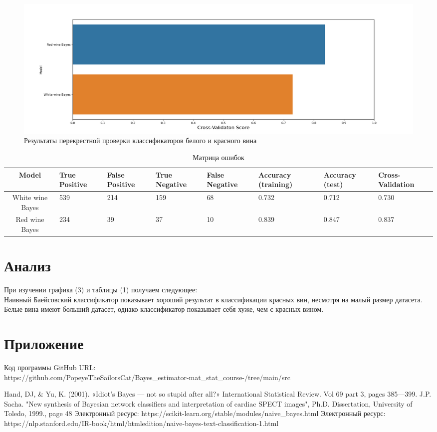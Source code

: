 \documentclass{article}
\begin{document}
\begin{figure}[H]
		\centering
		\includegraphics[width=0.95\paperwidth]{cros_val_test.png}
		\caption{Результаты перекрестной проверки классификаторов белого и красного вина}
	\end{figure}
	
	
\begin{table}[H]
    \centering
    \begin{tabular}{c|p{1.5 cm}|p{1.5 cm}|p{1.5 cm}|p{1.5 cm}|p{1.5 cm}|p{1.5 cm}|p{1.5 cm}}
         Model & True Positive & False Positive  &True Negative&  False Negative&  Accuracy (training) & Accuracy (test) & Cross-Validation\\\hline
 White wine Bayes &539     &      214  & 159  & 68     &0.732   &    0.712   &  0.730   \\   
 Red wine Bayes   &234 &  39 &    37    &    10   &  0.839  &          0.847   &     0.837 
    \end{tabular}
    \caption{Матрица ошибок}
    \end{table}

\section{Анализ}
При изучении графика (3) и таблицы (1) получаем следующее: \\
Наивный Баейсовский классификатор показывает хороший результат в классификации красных вин, несмотря на малый размер датасета. Белые вина имеют больший датасет, однако классификатор показывает себя хуже, чем с красных вином.
	
\section{Приложение}
\noindent Код программы GitHub URL:\\
\newline https://github.com/PopeyeTheSailorsCat/Bayes\_estimator-mat\_stat\_course-/tree/main/src

\begin{thebibliography}{9}

 Hand, DJ, & Yu, K. (2001). «Idiot’s Bayes — not so stupid after all?» International Statistical Review. Vol 69 part 3, pages 385—399.
 J.P. Sacha. "New synthesis of Bayesian network classifiers and interpretation of cardiac SPECT images", Ph.D. Dissertation, University of Toledo, 1999., page 48
 Электронный ресурс: https://scikit-learn.org/stable/modules/naive\_bayes.html
 Электронный ресурс: https://nlp.stanford.edu/IR-book/html/htmledition/naive-bayes-text-classification-1.html

\end{thebibliography}
\end{document}
